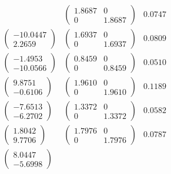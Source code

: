 \documentclass{article}
\begin{document}
\begin{math}
\begin{aligned}
& \left( \begin{array}{cc} 1.8687  & 0 \\   0 & 1.8687 
\end{array} \right) 
&   0.0747\\ %
\left( \begin{array}{c}   -10.0447 \\  2.2659
\end{array} \right) 
& \left( \begin{array}{cc}   1.6937  & 0 \\  0   & 1.6937 
\end{array} \right) 
&   0.0809\\ %
\left( \begin{array}{c}  -1.4953 \\  -10.0566
\end{array} \right)
& \left( \begin{array}{cc}   0.8459   & 0 \\   0 & 0.8459   
\end{array} \right) 
&   0.0510 \\ %
\left( \begin{array}{c}   9.8751 \\  -0.6106
\end{array} \right) 
& \left( \begin{array}{cc}   1.9610 & 0 \\   0 & 1.9610 
\end{array} \right) 
&   0.1189 \\ %
\left( \begin{array}{c} -7.6513 \\  -6.2702  
\end{array} \right) 
& \left( \begin{array}{cc}   1.3372 & 0 \\   0 & 1.3372
\end{array} \right) 
&   0.0582\\ %
\left( \begin{array}{c}  1.8042 \\  9.7706
\end{array} \right) 
& \left( \begin{array}{cc}   1.7976 &  0 \\   0 &  1.7976
\end{array} \right) 
&   0.0787\\ %
\left( \begin{array}{c}   8.0447 \\  -5.6998 
\end{array} \right) 

\end{aligned}
\end{math}
\end{document}

